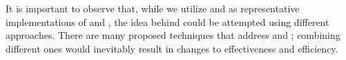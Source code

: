 


It is important to observe that, while we utilize \ek and \fs as representative implementations of \tcs and \tcp, the idea behind \fz could be attempted using different approaches.
There are many proposed techniques that address \tcs and \tcp; combining different ones would inevitably result in changes to effectiveness and efficiency.
